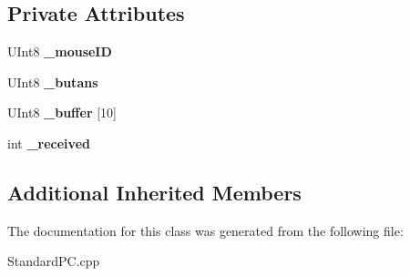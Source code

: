 \subsection*{Private Attributes}
\begin{DoxyCompactItemize}
\item 
\mbox{\label{class_standard_p_c___internal_1_1_p_s2_mouse_a8f59c807a6a491c80440080f41dd3d8b}} 
U\+Int8 {\bfseries \+\_\+mouse\+ID}
\item 
\mbox{\label{class_standard_p_c___internal_1_1_p_s2_mouse_ae35585a702d47d503f6e9c91ed86813b}} 
U\+Int8 {\bfseries \+\_\+butans}
\item 
\mbox{\label{class_standard_p_c___internal_1_1_p_s2_mouse_a87a881295699c3214acdf2a8f58702fd}} 
U\+Int8 {\bfseries \+\_\+buffer} \mbox{[}10\mbox{]}
\item 
\mbox{\label{class_standard_p_c___internal_1_1_p_s2_mouse_a231dc0ef268740792b4245349dc77dbb}} 
int {\bfseries \+\_\+received}
\end{DoxyCompactItemize}
\subsection*{Additional Inherited Members}


The documentation for this class was generated from the following file\+:\begin{DoxyCompactItemize}
\item 
Standard\+P\+C.\+cpp\end{DoxyCompactItemize}
